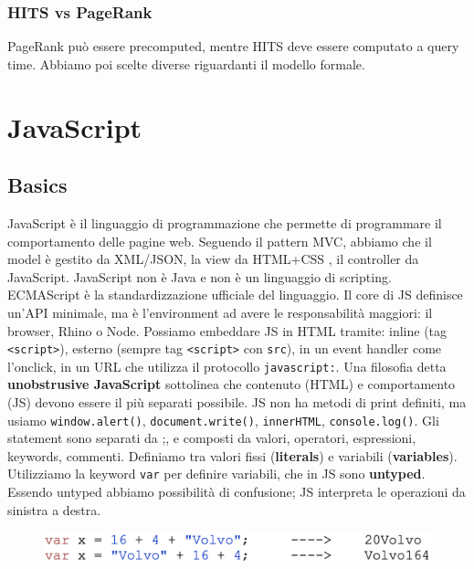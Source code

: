 \documentclass[11pt]{article}
\newcommand{\code}[1]{\texttt{#1}}
\begin{document}
\subsubsection{HITS vs PageRank}
PageRank può essere precomputed, mentre HITS deve essere computato a query time. Abbiamo poi scelte diverse riguardanti il modello formale.

\section{JavaScript}
\subsection{Basics}
JavaScript è il linguaggio di programmazione che permette di programmare il comportamento delle pagine web. Seguendo il pattern MVC, abbiamo che il model è gestito da XML/JSON, la view da HTML+CSS , il controller da JavaScript. JavaScript non è Java e non è un linguaggio di scripting. ECMAScript è la standardizzazione ufficiale del linguaggio. Il core di JS definisce un'API minimale, ma è l'environment ad avere le responsabilità maggiori: il browser, Rhino o Node. 
Possiamo embeddare JS in HTML tramite: inline (tag \code{<script>}), esterno (sempre tag \code{<script>} con \code{src}), in un event handler come l'onclick, in un URL che utilizza il protocollo \code{javascript:}. Una filosofia detta \textbf{unobstrusive JavaScript} sottolinea che contenuto (HTML) e comportamento (JS) devono essere il più separati possibile. JS non ha metodi di print definiti, ma usiamo \code{window.alert()}, \code{document.write()}, \code{innerHTML}, \code{console.log()}. Gli statement sono separati da ;, e composti da valori, operatori, espressioni, keywords, commenti. Definiamo tra valori fissi (\textbf{literals}) e variabili (\textbf{variables}). Utilizziamo la keyword \code{var} per definire variabili, che in JS sono \textbf{untyped}. Essendo untyped abbiamo possibilità di confusione; JS interpreta le operazioni da sinistra a destra. 
\begin{figure}[H]
    \centering
    \includegraphics[width=0.4\linewidth]{res/JSconfusion.png}
\end{figure}
\end{document}
